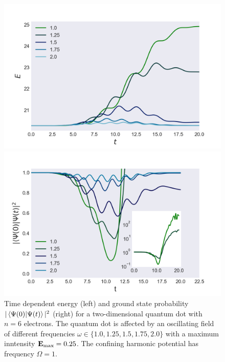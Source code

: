 \begin{figure}
    \centering
    \begin{minipage}{0.49\textwidth}
        \includegraphics[trim=2em 0em 5em 0em, width=\textwidth]{results/figures/2D/resonance/n6resonance.png} 
    \end{minipage}\hfill
    \begin{minipage}{0.49\textwidth}
        \includegraphics[trim=0em 0em 5em 0em, width=\textwidth]{results/figures/2D/resonance/n6_overlap_res.png} 
    \end{minipage}
    \caption{Time dependent energy (left) and ground state probability $|\braket{\Psi(0)}{\Psi(t)}|^2$
        (right) for a two-dimensional quantum dot with $n=6$ electrons. The quantum dot 
        is affected by an oscillating field of different frequencies
        $\omega\in\{1.0, 1.25, 1.5, 1.75, 2.0\}$ with a maximum inntensity
        $\vb{E}_\text{max} = 0.25$. The confining harmonic potential has frequency $\Omega=1$.
    }
    \label{fig:2d_resonance_n6}
\end{figure}


